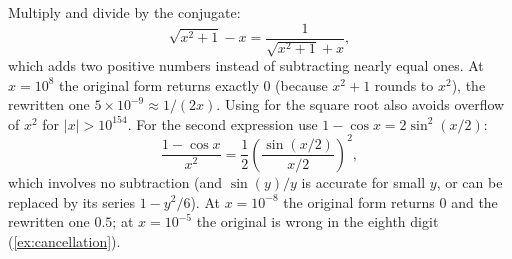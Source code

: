 \begin{solutions}
  \item Multiply and divide by the conjugate:
        \[
          \sqrt{x^2 + 1} - x = \frac{1}{\sqrt{x^2 + 1} + x},
        \]
        which adds two positive numbers instead of subtracting nearly equal ones. At $x = 10^8$ the original form returns exactly $0$
        (because $x^2 + 1$ rounds to $x^2$), the rewritten one $5\times10^{-9} \approx 1/(2x)$. Using  for the square root also
        avoids overflow of $x^2$ for $|x| > 10^{154}$. For the second expression use $1 - \cos x = 2\sin^2(x/2)$:
        \[
          \frac{1 - \cos x}{x^2} = \frac12\left(\frac{\sin(x/2)}{x/2}\right)^2,
        \]
        which involves no subtraction (and $\sin(y)/y$ is accurate for small $y$, or can be replaced by its series $1 - y^2/6$). At $x = 10^{-8}$
        the original form returns $0$ and the rewritten one $0.5$; at $x = 10^{-5}$ the original is wrong in the eighth digit
        (\cref{ex:cancellation}).
\end{solutions}
